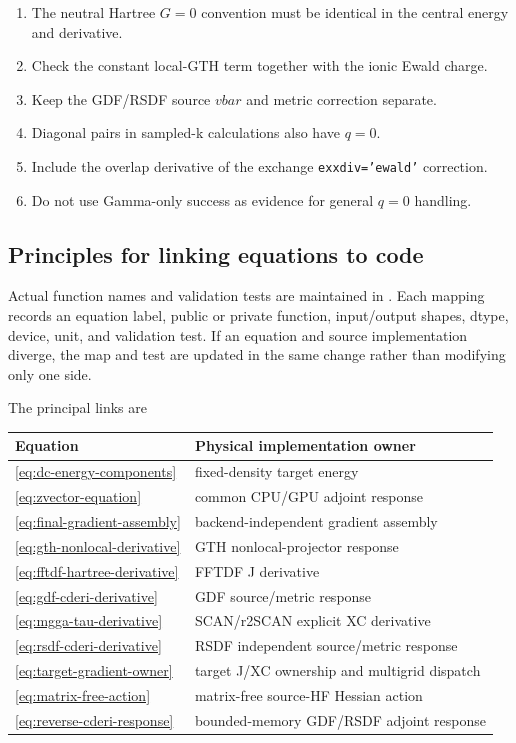 \begin{enumerate}
  \item The neutral Hartree $G=0$ convention must be identical in the central
        energy and derivative.
  \item Check the constant local-GTH term together with the ionic Ewald charge.
  \item Keep the GDF/RSDF source $vbar$ and metric correction separate.
  \item Diagonal pairs in sampled-k calculations also have $q=0$.
  \item Include the overlap derivative of the exchange
        \texttt{exxdiv='ewald'} correction.
  \item Do not use Gamma-only success as evidence for general $q=0$ handling.
\end{enumerate}

\subsection{Principles for linking equations to code}

Actual function names and validation tests are maintained in
.  Each mapping records an
equation label, public or private function, input/output shapes, dtype, device,
unit, and validation test.  If an equation and source implementation diverge,
the map and test are updated in the same change rather than modifying only one
side.

The principal links are
\begin{center}
\begin{longtable}{ll}
\toprule
Equation & Physical implementation owner \\
\midrule
\eqref{eq:dc-energy-components} & fixed-density target energy \\
\eqref{eq:zvector-equation} & common CPU/GPU adjoint response \\
\eqref{eq:final-gradient-assembly} & backend-independent gradient assembly \\
\eqref{eq:gth-nonlocal-derivative} & GTH nonlocal-projector response \\
\eqref{eq:fftdf-hartree-derivative} & FFTDF J derivative \\
\eqref{eq:gdf-cderi-derivative} & GDF source/metric response \\
\eqref{eq:mgga-tau-derivative} & SCAN/r2SCAN explicit XC derivative \\
\eqref{eq:rsdf-cderi-derivative} & RSDF independent source/metric response \\
\eqref{eq:target-gradient-owner} & target J/XC ownership and multigrid dispatch \\
\eqref{eq:matrix-free-action} & matrix-free source-HF Hessian action \\
\eqref{eq:reverse-cderi-response} & bounded-memory GDF/RSDF adjoint response \\
\bottomrule
\end{longtable}
\end{center}

